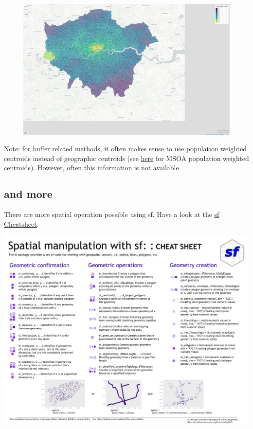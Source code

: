 \documentclass[
  letterpaper,
  DIV=11,
  numbers=noendperiod]{scrreprt}
\begin{document}
\begin{figure}[H]

{\centering \includegraphics{01_refresher_short_files/figure-pdf/unnamed-chunk-30-1.pdf}

}

\end{figure}

Note: for buffer related methods, it often makes sense to use population
weighted centroids instead of geographic centroids (see
\href{https://geoportal.statistics.gov.uk/datasets/ons::middle-layer-super-output-areas-december-2011-population-weighted-centroids/about}{here}
for MSOA population weighted centroids). However, often this information
is not available.

\hypertarget{and-more}{%
\subsection{and more}\label{and-more}}

There are more spatial operation possible using sf. Have a look at the
\href{fig/sf.pdf}{sf Cheatsheet}.

\includegraphics{fig/sf_1.png}
\end{document}
